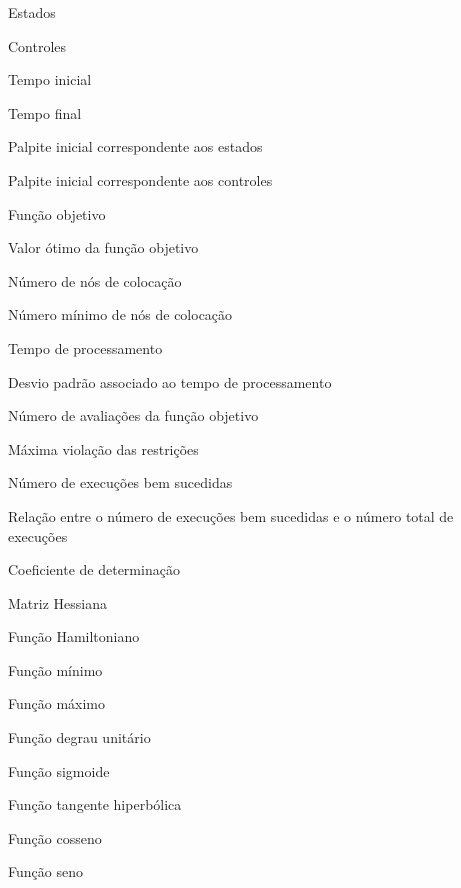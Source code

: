 \item[$ x $] Estados
\item[$ u $] Controles
\item[$ t_0 $] Tempo inicial
\item[$ t_f $] Tempo final
\item[$ x_p(t) $] Palpite inicial correspondente aos estados
\item[$ u_p(t) $] Palpite inicial correspondente aos controles
\item[$ J $] Função objetivo
\item[$ J^* $] Valor ótimo da função objetivo
\item[$ N $] Número de nós de colocação
\item[$ N_m $] Número mínimo de nós de colocação
\item[$ t_p $] Tempo de processamento
\item[$ s_t $] Desvio padrão associado ao tempo de processamento
\item[$ n_{aval} $] Número de avaliações da função objetivo
\item[$ \Delta c_{max} $] Máxima violação das restrições
\item[$ N_s $] Número de execuções bem sucedidas
\item[$ N_s\% $] Relação entre o número de execuções bem sucedidas e o número total de execuções
\item[$ R^2 $] Coeficiente de determinação
\item[$ \mathbf{H} $] Matriz Hessiana
\item[$ \mathit{H} $] Função Hamiltoniano
\item[$\min\{\} $] Função mínimo
\item[$\max\{\} $] Função máximo
\item[$ U_s $] Função degrau unitário
\item[$ sigm $] Função sigmoide
\item[$ \tanh $] Função tangente hiperbólica
\item[$ \cos $] Função cosseno
\item[$ \sin $] Função seno 








